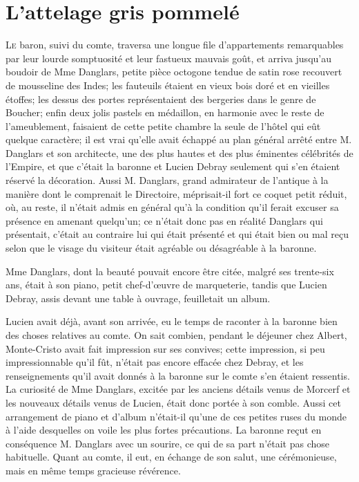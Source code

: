 \chapter{L'attelage gris pommelé}

\lettrine{L}{e} baron, suivi du comte, traversa une longue file d'appartements remarquables par leur lourde somptuosité et leur fastueux mauvais goût, et arriva jusqu'au boudoir de Mme Danglars, petite pièce octogone tendue de satin rose recouvert de mousseline des Indes; les fauteuils étaient en vieux bois doré et en vieilles étoffes; les dessus des portes représentaient des bergeries dans le genre de Boucher; enfin deux jolis pastels en médaillon, en harmonie avec le reste de l'ameublement, faisaient de cette petite chambre la seule de l'hôtel qui eût quelque caractère; il est vrai qu'elle avait échappé au plan général arrêté entre M. Danglars et son architecte, une des plus hautes et des plus éminentes célébrités de l'Empire, et que c'était la baronne et Lucien Debray seulement qui s'en étaient réservé la décoration. Aussi M. Danglars, grand admirateur de l'antique à la manière dont le comprenait le Directoire, méprisait-il fort ce coquet petit réduit, où, au reste, il n'était admis en général qu'à la condition qu'il ferait excuser sa présence en amenant quelqu'un; ce n'était donc pas en réalité Danglars qui présentait, c'était au contraire lui qui était présenté et qui était bien ou mal reçu selon que le visage du visiteur était agréable ou désagréable à la baronne. 

Mme Danglars, dont la beauté pouvait encore être citée, malgré ses trente-six ans, était à son piano, petit chef-d'œuvre de marqueterie, tandis que Lucien Debray, assis devant une table à ouvrage, feuilletait un album. 

Lucien avait déjà, avant son arrivée, eu le temps de raconter à la baronne bien des choses relatives au comte. On sait combien, pendant le déjeuner chez Albert, Monte-Cristo avait fait impression sur ses convives; cette impression, si peu impressionnable qu'il fût, n'était pas encore effacée chez Debray, et les renseignements qu'il avait donnés à la baronne sur le comte s'en étaient ressentis. La curiosité de Mme Danglars, excitée par les anciens détails venus de Morcerf et les nouveaux détails venus de Lucien, était donc portée à son comble. Aussi cet arrangement de piano et d'album n'était-il qu'une de ces petites ruses du monde à l'aide desquelles on voile les plus fortes précautions. La baronne reçut en conséquence M. Danglars avec un sourire, ce qui de sa part n'était pas chose habituelle. Quant au comte, il eut, en échange de son salut, une cérémonieuse, mais en même temps gracieuse révérence. 

